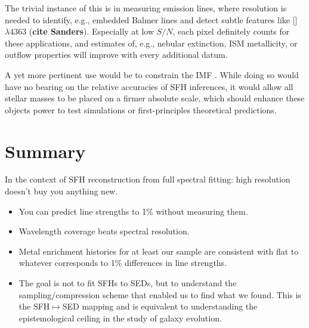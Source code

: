 \documentclass[a4paper,fleqn,usenatbib]{mnras}
\newcommand{\bfr}{\bf\color{red}}
\newcommand{\bitem}{\begin{itemize}}
\newcommand{\eitem}{\end{itemize}}
\begin{document}

The trivial instance of this is in measuring emission lines, where resolution is needed to 
identify, e.g., embedded Balmer lines and detect subtle features like [] 
$\lambda4363$ ({\bfr cite Sanders}). Especially at low $S/N$, each pixel definitely counts
for these applications, and estimates of, e.g., nebular extinction, ISM metallicity, or outflow
properties will improve with every additional datum.

A yet more pertinent use would be to constrain the IMF \citep{Conroy12}. While doing so 
would have no bearing on the relative accuracies of SFH inferences, it would allow all stellar 
masses to be placed on a firmer absolute scale, which should enhance these objects power to test 
simulations or first-principles theoretical predictions. %
\fi

%


\section{Summary}
\label{sec:summary}

In the context of SFH reconstruction from full spectral fitting: high resolution doesn't buy you
anything new.

\bitem
	\item You can predict line strengths to 1\% without measuring them.
	\item Wavelength coverage beats spectral resolution.
	\item Metal enrichment histories for at least our sample are consistent 
		with flat to whatever corresponds to 1\% differences in line strengths.
	\item The goal is not to fit SFHs to SEDs, but to understand the sampling/compression
		scheme that enabled us to find what we found. This is the SFH$\mapsto$SED
		mapping and is equivalent to understanding the epistemological ceiling 
		in the study of galaxy evolution.
\eitem
\end{document}
